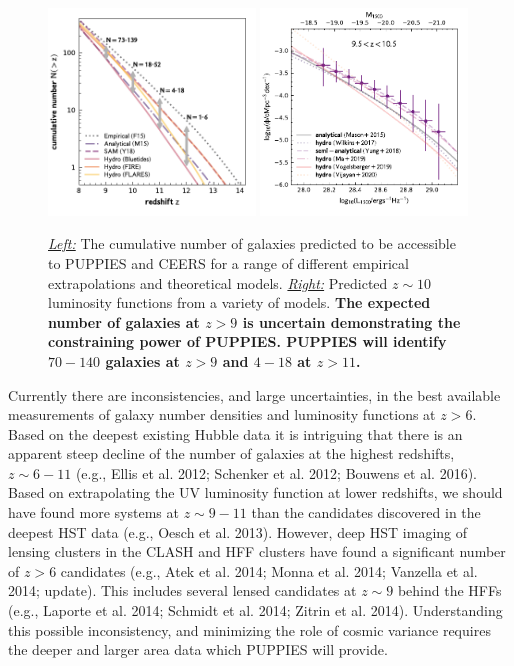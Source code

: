 \documentclass[12pt]{article}
\begin{document}
 \begin{figure}[h!]
    \centering
    \includegraphics[width=0.49\textwidth]{figs/CN_models.pdf}
    \includegraphics[width=0.49\textwidth]{figs/LF_models_10.pdf}
    \vspace{-5mm}
    \caption{\emph{\underline{Left:}} The cumulative number of galaxies predicted to be accessible to PUPPIES and CEERS for a range of different empirical extrapolations and theoretical models. \emph{\underline{Right:}} Predicted $z\sim 10$ luminosity functions from a variety of models. \textbf{The expected number of galaxies at $z>9$ is uncertain demonstrating the constraining power of PUPPIES. PUPPIES will identify $70-140$ galaxies at $z>9$ and $4-18$ at $z>11$.}}
    \label{fig:models}
\end{figure}


 
 
Currently there are inconsistencies, and large uncertainties, in the best available measurements of galaxy number densities and luminosity functions at $z > 6$.  Based on the deepest existing Hubble data it is intriguing that there is an apparent steep decline of the number of galaxies at the highest redshifts, $z \sim 6-11$ (e.g., Ellis et al. 2012; Schenker et al. 2012; Bouwens et al. 2016). Based on extrapolating the UV luminosity function at lower redshifts, we should have found more systems at $z \sim 9-11$ than the candidates discovered in the deepest HST data (e.g., Oesch et al. 2013).  However, deep HST imaging of lensing clusters in the CLASH and HFF clusters have found a significant number of $z>6$ candidates (e.g., Atek et al. 2014; Monna et al. 2014; Vanzella et al. 2014; update).  This includes several lensed candidates at $z\sim 9$ behind the HFFs (e.g., Laporte et al. 2014; Schmidt et al. 2014; Zitrin et al. 2014).   Understanding this possible inconsistency, and minimizing the role of cosmic variance requires the deeper and larger area data which PUPPIES will provide.
\end{document}
